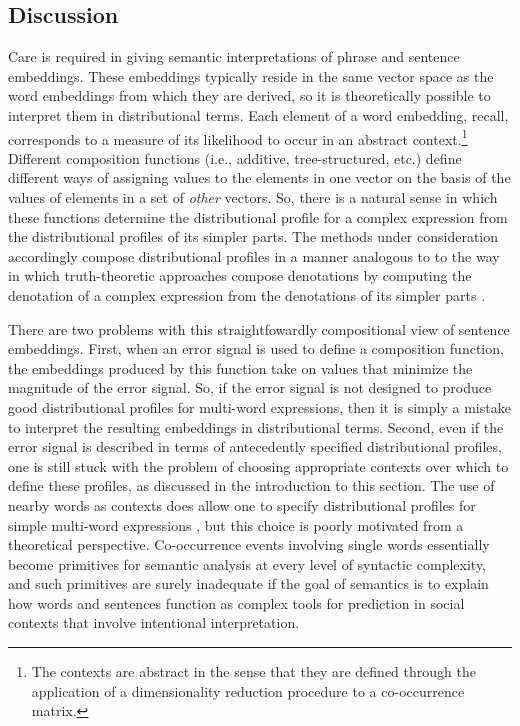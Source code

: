 \subsection{Discussion}

Care is required in giving semantic interpretations of phrase and sentence embeddings. These embeddings typically reside in the same vector space as the word embeddings from which they are derived, so it is theoretically possible to interpret them in distributional terms. Each element of a word embedding, recall, corresponds to a measure of its likelihood to occur in an abstract context.\footnote{The contexts are abstract in the sense that they are defined through the application of a dimensionality reduction procedure to a co-occurrence matrix.} Different composition functions (i.e., additive, tree-structured, etc.) define different ways of assigning values to the elements in one vector on the basis of the values of elements in a set of \textit{other} vectors. So, there is a natural sense in which these functions determine the distributional profile for a complex expression from the distributional profiles of its simpler parts. The methods under consideration accordingly compose distributional profiles in a manner analogous to to the way in which truth-theoretic approaches compose denotations by computing the denotation of a complex expression from the denotations of its simpler parts \citep{Carpenter:1997}. 

There are two problems with this straightfowardly compositional view of sentence embeddings. First, when an error signal is used to define a composition function, the embeddings produced by this function take on values that minimize the magnitude of the error signal. So, if the error signal is not designed to produce good distributional profiles for multi-word expressions, then it is simply a mistake to interpret the resulting embeddings in distributional terms. Second, even if the error signal is described in terms of antecedently specified distributional profiles, one is still stuck with the problem of choosing appropriate contexts over which to define these profiles, as discussed in the introduction to this section. The use of nearby words as contexts does allow one to specify distributional profiles for simple multi-word expressions \citep[see][pp. 290-295]{Baroni:2014}, but this choice is poorly motivated from a theoretical perspective. Co-occurrence events involving single words essentially become primitives for semantic analysis at every level of syntactic complexity, and such primitives are surely inadequate if the goal of semantics is to explain how words and sentences function as complex tools for prediction in social contexts that involve intentional interpretation. 

